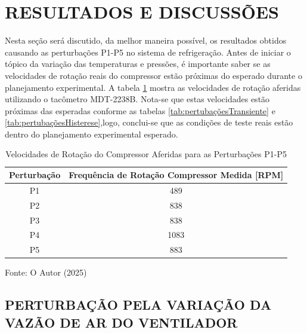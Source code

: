 \section{RESULTADOS E DISCUSSÕES}

Nesta seção será discutido, da melhor maneira possível, os resultados obtidos causando as perturbações P1-P5 no sistema de refrigeração. Antes de iniciar o tópico da variação das temperaturas e pressões, é importante saber se as velocidades de rotação reais do compressor estão próximas do esperado durante o planejamento experimental. A tabela \ref{tab:Rotações Medidas} mostra as velocidades de rotação aferidas utilizando o tacômetro MDT-2238B. Nota-se que estas velocidades estão próximas das esperadas conforme as tabelas \ref{tab:pertubaçõesTransiente} e \ref{tab:pertubaçõesHisterese},logo, conclui-se que as condições de teste reais estão dentro do planejamento experimental esperado.

\begin{table}[htb]
    \centering
    \begin{tabular}{|c|c|}
        \hline
        \textbf{Perturbação} & \textbf{Frequência de Rotação Compressor Medida [RPM]} \\
        \hline
        P1 & 489 \\
        P2 & 838 \\
        P3 & 838 \\        
        P4 & 1083 \\
        P5 & 883 \\
        \hline
    \end{tabular}
    \caption{Velocidades de Rotação do Compressor Aferidas para as Perturbações P1-P5}
    \vspace{5pt} 
{\footnotesize Fonte: O Autor (2025) }
    \label{tab:Rotações Medidas}
\end{table}

\subsection{\MakeUppercase{Perturbação pela Variação da Vazão de Ar do Ventilador}} \label{subsec:PertubaçãoVelVentilador}

